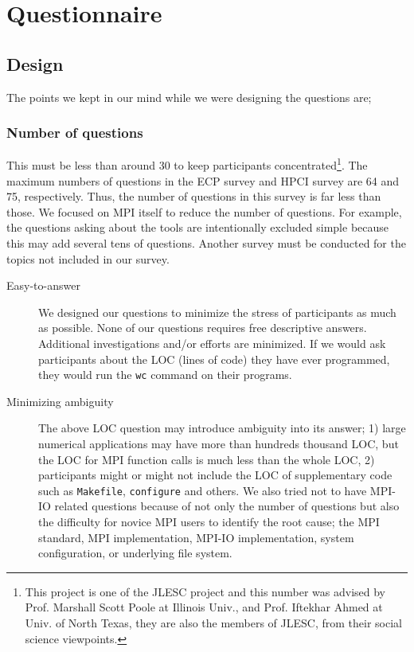 \documentclass[submit,techrep,noauthor,english]{ipsj}
\begin{document}
\section{Questionnaire}

\subsection{Design}

The points we kept in our mind while we were designing the
questions are; 

\subsubsection*{Number of questions}
This must be less than around 30 to keep  participants
concentrated\footnote{This project is one of the JLESC
  project\cite{JLESC} and 
  this number was advised by Prof. Marshall Scott Poole at Illinois Univ.,
  and Prof. Iftekhar Ahmed at Univ. of North Texas, they are also the
  members of JLESC\cite{JLESC}, from their social science viewpoints.}.
The maximum numbers of questions in the ECP survey and HPCI survey are
64 and 75, respectively. Thus, the number of questions in this survey
is far less than those.  We focused on MPI itself to reduce the number
of questions.  For example, the questions asking about the tools are
intentionally excluded simple because this may add several tens of
questions. Another survey must be conducted for the topics not
included in our survey.

\begin{description}
\item[Easy-to-answer]
We designed our questions to minimize the stress of participants as
much as possible. None of our questions requires free descriptive
answers. Additional investigations and/or efforts are minimized. If we
would ask participants about the LOC (lines of code) they have ever
programmed, they would run the {\tt wc} command on their programs.  

\item[Minimizing ambiguity]
The above LOC question may introduce ambiguity into its answer; 1)
large numerical applications may have more than hundreds thousand LOC,
but the LOC for MPI function calls is much less than the whole LOC, 2)
participants might or might not include the LOC of supplementary code
such as {\tt Makefile}, {\tt configure} and others. 
We also tried not to have MPI-IO related questions because of not only
the number of questions but also the difficulty for novice MPI users
to identify the root cause; the MPI standard, MPI implementation,
MPI-IO implementation, system configuration, or underlying file
system. 
\end{description}
\end{document}
